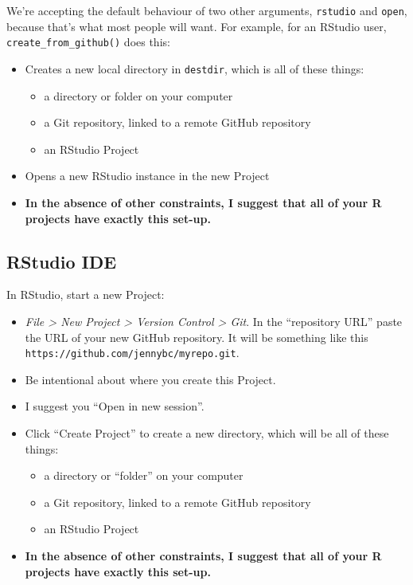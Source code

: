 \documentclass[
]{book}
\providecommand{\tightlist}{%
  \setlength{\itemsep}{0pt}\setlength{\parskip}{0pt}}
\begin{document}
We're accepting the default behaviour of two other arguments, \texttt{rstudio} and \texttt{open}, because that's what most people will want.
For example, for an RStudio user, \texttt{create\_from\_github()} does this:

\begin{itemize}
\tightlist
\item
  Creates a new local directory in \texttt{destdir}, which is all of these things:

  \begin{itemize}
  \tightlist
  \item
    a directory or folder on your computer
  \item
    a Git repository, linked to a remote GitHub repository
  \item
    an RStudio Project
  \end{itemize}
\item
  Opens a new RStudio instance in the new Project
\item
  \textbf{In the absence of other constraints, I suggest that all of your R projects have exactly this set-up.}
\end{itemize}

\subsection{RStudio IDE}\label{rstudio-ide-1}

In RStudio, start a new Project:

\begin{itemize}
\tightlist
\item
  \emph{File \textgreater{} New Project \textgreater{} Version Control \textgreater{} Git}. In the ``repository URL'' paste
  the URL of your new GitHub repository. It will be something like this
  \texttt{https://github.com/jennybc/myrepo.git}.
\item
  Be intentional about where you create this Project.
\item
  I suggest you ``Open in new session''.
\item
  Click ``Create Project'' to create a new directory, which will be all of these things:

  \begin{itemize}
  \tightlist
  \item
    a directory or ``folder'' on your computer
  \item
    a Git repository, linked to a remote GitHub repository
  \item
    an RStudio Project
  \end{itemize}
\item
  \textbf{In the absence of other constraints, I suggest that all of your R projects have exactly this set-up.}
\end{itemize}
\end{document}
